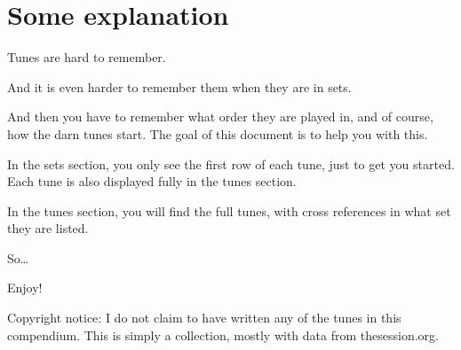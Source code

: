 \documentclass[10pt]{book}
\begin{document}

\setcounter{tocdepth}{3}
\tableofcontents
{}
\clearpage

\setcounter{page}{1}
\chapter*{Some explanation}
Tunes are hard to remember.

And it is even harder to remember them when they are in sets.

And then you have to remember what order they are played in, and of course, how the darn tunes start. The goal of this document is to help you with this.

In the sets section, you only see the first row of each tune, just to get you started. Each tune is also displayed fully in the tunes section.

In the tunes section, you will find the full tunes, with cross references in what set they are listed.

So\ldots

Enjoy!

Copyright notice: I do not claim to have written any of the tunes in this compendium. This is simply a collection, mostly with data from thesession.org. 





\printindex
\end{document}
